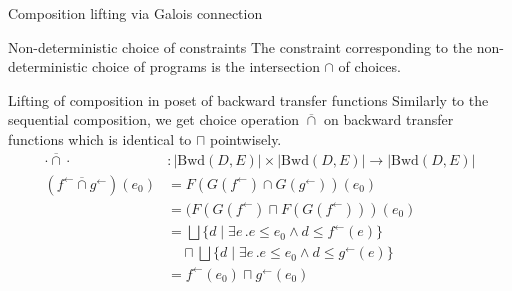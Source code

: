 \documentclass{beamer}
\newcommand{\Unidir}{\mathrm{Bwd}}
\newcommand{\fb}{{f^{\leftarrow}}}
\newcommand{\gb}{{g^{\leftarrow}}}
\newcommand{\bigjoin}{\bigsqcup}
\newcommand{\meet}{\sqcap}
\newcommand{\caplift}{\mathbin{\overline{\cap}}}
\begin{document}
\begin{frame} [fragile] {Composition lifting via Galois connection}
  \begin{block}{Non-deterministic choice of constraints}
    The constraint corresponding to the non-deterministic choice of programs is the intersection $\cap$ of choices.
  \end{block}
  \begin{block}{Lifting of composition in poset of backward transfer functions}
    Similarly to the sequential composition, we get choice operation $\caplift$ on backward transfer functions which is identical to $\meet$ pointwisely.
    \begin{align*}
      \cdot \caplift \cdot &: \left| \Unidir(D , E) \right| \times  \left| \Unidir(D, E) \right| \to \left| \Unidir(D, E) \right| \\
      (\fb \caplift \gb) (e_{0})
      &= F(G(\fb) \cap G(\gb)) (e_{0}) \\
      &= (F(G(\fb) \meet F(G(\fb))) (e_{0}) \\
      &= \bigjoin \{ d \mid \exists e\,. e \leq e_{0} \land d \leq \fb(e) \} \\ &\quad \meet \bigjoin \{ d \mid \exists e\,. e \leq e_{0} \land d \leq \gb(e) \} \\
      &= \fb(e_{0}) \meet \gb(e_{0})
    \end{align*}
  \end{block}
\end{frame}
\end{document}
